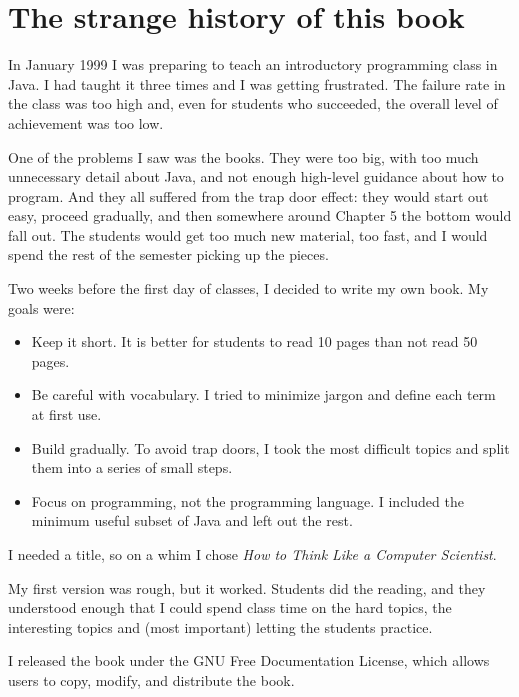 \documentclass[10pt]{book}
\begin{document}
\section*{The strange history of this book}

In January 1999 I was preparing to teach an introductory programming
class in Java.  I had taught it three times and I was getting
frustrated.  The failure rate in the class was too high and, even for
students who succeeded, the overall level of achievement was too low.

One of the problems I saw was the books.  
They were too big, with too much unnecessary detail about Java, and
not enough high-level guidance about how to program.  And they all
suffered from the trap door effect: they would start out easy,
proceed gradually, and then somewhere around Chapter 5 the bottom would
fall out.  The students would get too much new material, too fast,
and I would spend the rest of the semester picking up the pieces.

Two weeks before the first day of classes, I decided to write my
own book.  My goals were:

\begin{itemize}

\item Keep it short.  It is better for students to read 10 pages
than not read 50 pages.

\item Be careful with vocabulary.  I tried to minimize jargon
and define each term at first use.

\item Build gradually. To avoid trap doors, I took the most difficult
topics and split them into a series of small steps. 

\item Focus on programming, not the programming language.  I included
the minimum useful subset of Java and left out the rest.

\end{itemize}

I needed a title, so on a whim I chose {\em How to Think Like
a Computer Scientist}.

My first version was rough, but it worked.  Students did the reading,
and they understood enough that I could spend class time on the hard
topics, the interesting topics and (most important) letting the
students practice.

I released the book under the GNU Free Documentation License,
which allows users to copy, modify, and distribute the book.
\end{document}
